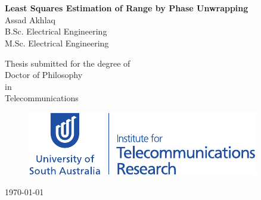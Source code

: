 \newcommand{\doctitle}{Least Squares Estimation  of Range by Phase Unwrapping }

\begin{center}


  \huge{~\\~\\}

  \huge{\bf\doctitle}\\

  \vspace{15mm}
  {\huge{Assad Akhlaq}}\\
  {\Large B.Sc. Electrical Engineering} \\
  {\Large M.Sc. Electrical Engineering } 


  \vspace{20mm}
  \Large{Thesis submitted for the degree of\\
    Doctor of Philosophy\\ in \\Telecommunications}
\vspace{20 mm}
  \Large{~\\}

  \begin{figure} [h]
    \centering
      \includegraphics[width=0.80\columnwidth]{InstTelecomRsch_01.pdf}
  \end{figure}


  \vspace{20mm}

  \Large{\today}  %

\end{center}

